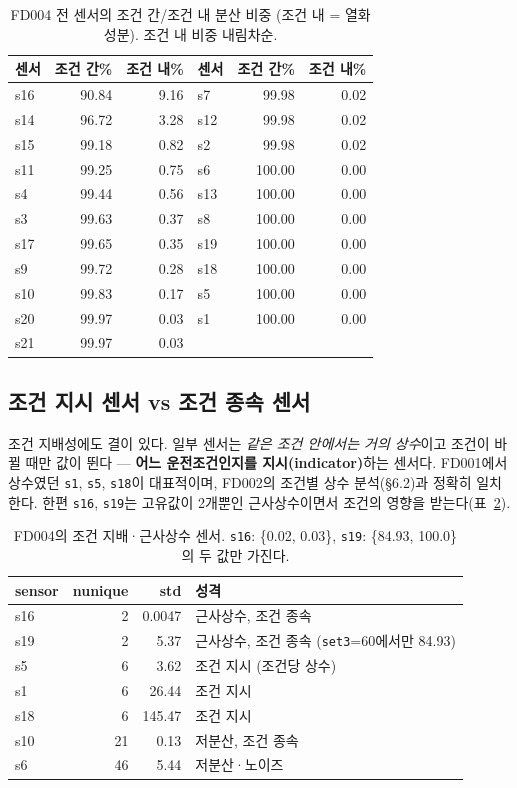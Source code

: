 \documentclass[11pt]{article}
\begin{document}
\begin{table}[H]
\centering
\caption{FD004 전 센서의 조건 간/조건 내 분산 비중 (조건 내 = 열화 성분). 조건 내 비중 내림차순.}
\label{tab:vardecomp}
\begin{tabular}{lrr@{\hskip 2.2em}lrr}
\toprule
센서 & 조건 간\% & 조건 내\% & 센서 & 조건 간\% & 조건 내\% \\
\midrule
s16 & 90.84 & 9.16 & s7  & 99.98 & 0.02 \\
s14 & 96.72 & 3.28 & s12 & 99.98 & 0.02 \\
s15 & 99.18 & 0.82 & s2  & 99.98 & 0.02 \\
s11 & 99.25 & 0.75 & s6  & 100.00 & 0.00 \\
s4  & 99.44 & 0.56 & s13 & 100.00 & 0.00 \\
s3  & 99.63 & 0.37 & s8  & 100.00 & 0.00 \\
s17 & 99.65 & 0.35 & s19 & 100.00 & 0.00 \\
s9  & 99.72 & 0.28 & s18 & 100.00 & 0.00 \\
s10 & 99.83 & 0.17 & s5  & 100.00 & 0.00 \\
s20 & 99.97 & 0.03 & s1  & 100.00 & 0.00 \\
s21 & 99.97 & 0.03 &     &        &       \\
\bottomrule
\end{tabular}
\end{table}

\subsection{조건 지시 센서 vs 조건 종속 센서}

조건 지배성에도 결이 있다.
일부 센서는 \emph{같은 조건 안에서는 거의 상수}이고 조건이 바뀔 때만 값이 뛴다 — \textbf{어느 운전조건인지를 지시(indicator)}하는 센서다.
FD001에서 상수였던 \texttt{s1}, \texttt{s5}, \texttt{s18}이 대표적이며, FD002의 조건별 상수 분석(\S6.2)과 정확히 일치한다.
한편 \texttt{s16}, \texttt{s19}는 고유값이 2개뿐인 근사상수이면서 조건의 영향을 받는다(표~\ref{tab:fd004nunique}).

\begin{table}[H]
\centering
\caption{FD004의 조건 지배·근사상수 센서. \texttt{s16}: \{0.02, 0.03\}, \texttt{s19}: \{84.93, 100.0\}의 두 값만 가진다.}
\label{tab:fd004nunique}
\begin{tabular}{lrrl}
\toprule
sensor & nunique & std & 성격 \\
\midrule
s16 & 2  & 0.0047 & 근사상수, 조건 종속 \\
s19 & 2  & 5.37   & 근사상수, 조건 종속 (\texttt{set3}=60에서만 84.93) \\
s5  & 6  & 3.62   & 조건 지시 (조건당 상수) \\
s1  & 6  & 26.44  & 조건 지시 \\
s18 & 6  & 145.47 & 조건 지시 \\
s10 & 21 & 0.13   & 저분산, 조건 종속 \\
s6  & 46 & 5.44   & 저분산·노이즈 \\
\bottomrule
\end{tabular}
\end{table}
\end{document}

